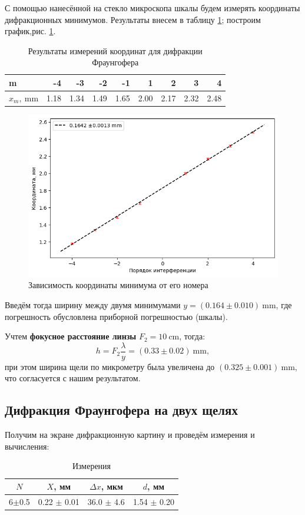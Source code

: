 \documentclass[12pt, a4paper]{article}
\newcommand{\mim}{~\mathrm{mm}}
\begin{document}
С помощью нанесённой на стекло микроскопа шкалы будем измерять координаты дифракционных минимумов.
Результаты внесем в таблицу \ref{tab:fraunhofer}; построим график,рис. \ref{pic:fraunhofer}.

\begin{table}[H]
  \begin{tabular}{|l|r|r|r|r|r|r|r|r|}
    \hline
    m           & -4   & -3   & -2   & -1   & 1    & 2    & 3    & 4    \\ \hline
    $x_m, \mim$ & 1.18 & 1.34 & 1.49 & 1.65 & 2.00 & 2.17 & 2.32 & 2.48 \\ \hline
  \end{tabular}
  \caption{Результаты измерений координат для дифракции Фраунгофера}
  \label{tab:fraunhofer}
\end{table}


\begin{figure}[H]
  \includegraphics[width=0.7\linewidth]{pics/fraunhofer.png}
  \caption{Зависимость координаты минимума от его номера}
  \label{pic:fraunhofer}
\end{figure}

Введём тогда ширину между двумя минимумами $y = (0.164 \pm 0.010)\mim$, где погрешность обусловлена
приборной погрешностью (шкалы).


Учтем \textbf{фокусное расстояние линзы }$F_2 = 10~\mathrm{cm}$, тогда:
$$h = F_2 \frac{\lambda}{y} = (0.33\pm0.02)\mim,$$
при этом ширина щели по микрометру была увеличена до $(0.325\pm0.001)\mim$, что согласуется с нашим
результатом.

\subsection{Дифракция Фраунгофера на двух щелях}

Получим на экране дифракционную картину и проведём измерения и вычисления:

\begin{table}[H]
  \centering
  \caption{Измерения}
  \begin{tabular}{|c|c|c|c|} \hline
    $N$     & $X$, мм         & $\Delta x$, мкм & $d$, мм           \\
    \hline
    6$\pm$0.5 & 0.22 $\pm$ 0.01 & 36.0 $\pm$ 4.6  & 1.54 $\pm$ 0.20 \\ \hline
  \end{tabular}
\end{table}
\end{document}
